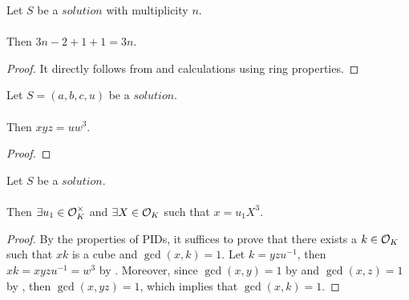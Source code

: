 \begin{lemma}
    \label{lmm:mult_minus_two_plus_one_plus_one}
    \leanok
    Let $S$ be a $solution$ with multiplicity $n$.\\\\
    Then $3n - 2 + 1 + 1 = 3n$.
\end{lemma}
\begin{proof}
    \leanok
    It directly follows from 
    and calculations using ring properties.
\end{proof}

\begin{lemma}
    \label{lmm:x_mul_y_mul_z_eq_u_w_pow_three}
    \leanok
    Let $S=(a,b,c,u)$ be a $solution$.\\\\
    Then $x y z = u w^3$.
\end{lemma}
\begin{proof}
    \leanok
\end{proof}

\begin{lemma}
    \label{lmm:x_eq_unit_mul_cube}
    \leanok
    Let $S$ be a $solution$.\\\\
    Then $\exists u_1 \in \mathcal{O}^\times_K$ and $\exists X \in \mathcal{O}_K$
    such that $x = u_1 X^3$.
\end{lemma}
\begin{proof}
    \leanok
    By the properties of PIDs, it suffices to prove that there exists a $k\in \mathcal{O}_K$ such that
    $xk$ is a cube and $\gcd(x,k)=1$.
    Let $k = yzu^{-1}$, then $xk = x y z u^{-1} = w^3$ by .
    Moreover, since $\gcd(x,y)=1$ by  and $\gcd(x,z)=1$ by ,
    then $\gcd(x,yz)=1$, which implies that $\gcd(x,k)=1$.
\end{proof}

